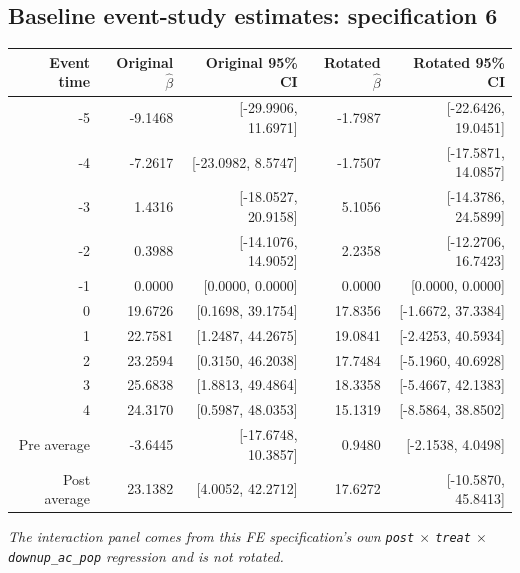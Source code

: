 \documentclass[10pt]{article}
\begin{document}
\subsection*{Baseline event-study estimates: specification 6}
\begin{center}
\scriptsize
\begin{tabular}{r rr rr}
\toprule
Event time & Original $\hat\beta$ & Original 95\% CI & Rotated $\hat\beta$ & Rotated 95\% CI \\
\midrule
-5 & -9.1468 & [-29.9906, 11.6971] & -1.7987 & [-22.6426, 19.0451] \\
-4 & -7.2617 & [-23.0982, 8.5747] & -1.7507 & [-17.5871, 14.0857] \\
-3 & 1.4316 & [-18.0527, 20.9158] & 5.1056 & [-14.3786, 24.5899] \\
-2 & 0.3988 & [-14.1076, 14.9052] & 2.2358 & [-12.2706, 16.7423] \\
-1 & 0.0000 & [0.0000, 0.0000] & 0.0000 & [0.0000, 0.0000] \\
0 & 19.6726 & [0.1698, 39.1754] & 17.8356 & [-1.6672, 37.3384] \\
1 & 22.7581 & [1.2487, 44.2675] & 19.0841 & [-2.4253, 40.5934] \\
2 & 23.2594 & [0.3150, 46.2038] & 17.7484 & [-5.1960, 40.6928] \\
3 & 25.6838 & [1.8813, 49.4864] & 18.3358 & [-5.4667, 42.1383] \\
4 & 24.3170 & [0.5987, 48.0353] & 15.1319 & [-8.5864, 38.8502] \\
\midrule
Pre average & -3.6445 & [-17.6748, 10.3857] & 0.9480 & [-2.1538, 4.0498] \\
Post average & 23.1382 & [4.0052, 42.2712] & 17.6272 & [-10.5870, 45.8413] \\
\bottomrule
\end{tabular}
\end{center}
\medskip
\textit{The interaction panel comes from this FE specification's own \texttt{post} $\times$ \texttt{treat} $\times$ \texttt{downup\_ac\_pop} regression and is not rotated.}
\clearpage
\end{document}
